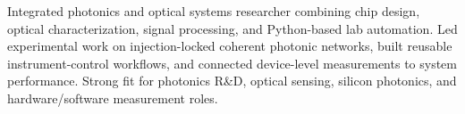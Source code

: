 
\begin{cvparagraph}

{Integrated photonics and optical systems researcher combining chip design, optical characterization, signal processing, and Python-based lab automation. Led experimental work on injection-locked coherent photonic networks, built reusable instrument-control workflows, and connected device-level measurements to system performance. Strong fit for photonics R\&D, optical sensing, silicon photonics, and hardware/software measurement roles.}
\vspace{-0.45cm}
\end{cvparagraph}


